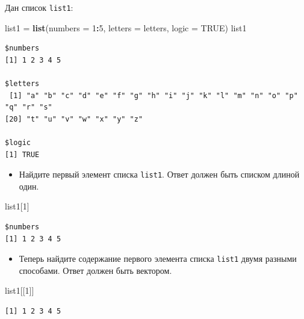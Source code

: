 \documentclass[
]{book}
\newenvironment{Shaded}{\begin{snugshade}}{\end{snugshade}}
\newcommand{\DataTypeTok}[1]{\textcolor[rgb]{0.13,0.29,0.53}{#1}}
\newcommand{\DecValTok}[1]{\textcolor[rgb]{0.00,0.00,0.81}{#1}}
\newcommand{\KeywordTok}[1]{\textcolor[rgb]{0.13,0.29,0.53}{\textbf{#1}}}
\newcommand{\NormalTok}[1]{#1}
\newcommand{\OperatorTok}[1]{\textcolor[rgb]{0.81,0.36,0.00}{\textbf{#1}}}
\newcommand{\OtherTok}[1]{\textcolor[rgb]{0.56,0.35,0.01}{#1}}
\newcommand{\StringTok}[1]{\textcolor[rgb]{0.31,0.60,0.02}{#1}}
\providecommand{\tightlist}{%
  \setlength{\itemsep}{0pt}\setlength{\parskip}{0pt}}
\begin{document}
Дан список \texttt{list1}:

\begin{Shaded}
\begin{Highlighting}[]
\NormalTok{list1 =}\StringTok{ }\KeywordTok{list}\NormalTok{(}\DataTypeTok{numbers =} \DecValTok{1}\OperatorTok{:}\DecValTok{5}\NormalTok{, }\DataTypeTok{letters =}\NormalTok{ letters, }\DataTypeTok{logic =} \OtherTok{TRUE}\NormalTok{)}
\NormalTok{list1}
\end{Highlighting}
\end{Shaded}

\begin{verbatim}
$numbers
[1] 1 2 3 4 5

$letters
 [1] "a" "b" "c" "d" "e" "f" "g" "h" "i" "j" "k" "l" "m" "n" "o" "p" "q" "r" "s"
[20] "t" "u" "v" "w" "x" "y" "z"

$logic
[1] TRUE
\end{verbatim}

\begin{itemize}
\tightlist
\item
  Найдите первый элемент списка \texttt{list1}. Ответ должен быть списком длиной один.
\end{itemize}

\begin{Shaded}
\begin{Highlighting}[]
\NormalTok{list1[}\DecValTok{1}\NormalTok{]}
\end{Highlighting}
\end{Shaded}

\begin{verbatim}
$numbers
[1] 1 2 3 4 5
\end{verbatim}

\begin{itemize}
\tightlist
\item
  Теперь найдите содержание первого элемента списка \texttt{list1} двумя разными способами. Ответ должен быть вектором.
\end{itemize}

\begin{Shaded}
\begin{Highlighting}[]
\NormalTok{list1[[}\DecValTok{1}\NormalTok{]]}
\end{Highlighting}
\end{Shaded}

\begin{verbatim}
[1] 1 2 3 4 5
\end{verbatim}

\begin{Shaded}
\end{Shaded}
\end{document}
